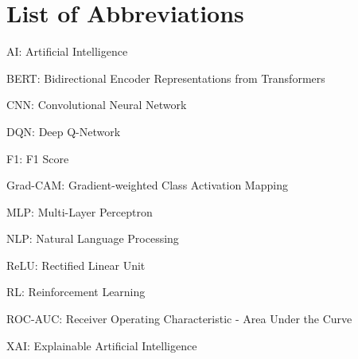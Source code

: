 \section*{List of Abbreviations}


AI: Artificial Intelligence


BERT: Bidirectional Encoder Representations from Transformers


CNN: Convolutional Neural Network


DQN: Deep Q-Network


F1: F1 Score


Grad-CAM: Gradient-weighted Class Activation Mapping


MLP: Multi-Layer Perceptron


NLP: Natural Language Processing


ReLU: Rectified Linear Unit


RL: Reinforcement Learning


ROC-AUC: Receiver Operating Characteristic - Area Under the Curve


XAI: Explainable Artificial Intelligence
